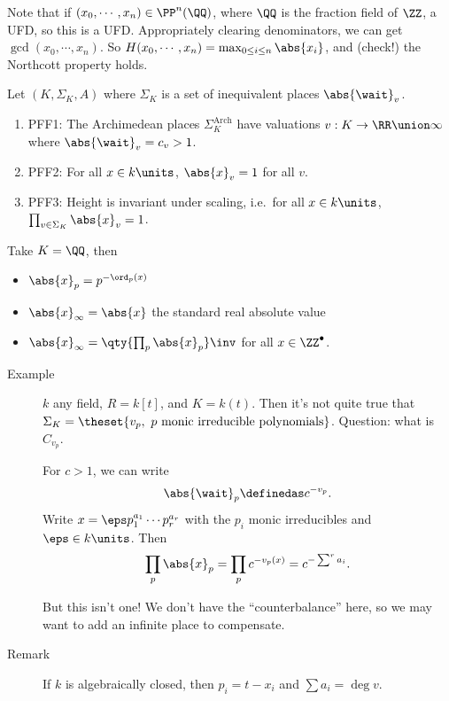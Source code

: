 Note that if \((x_0, \cdots, x_n) \in \PP^n(\QQ)\), where \(\QQ\) is the
fraction field of \(\ZZ\), a UFD, so this is a UFD. Appropriately
clearing denominators, we can get \(\gcd(x_0, \cdots, x_n)\). So
\(H(x_0, \cdots, x_n) = \max_{0\leq i \leq n} \abs{x_i}\), and (check!)
the Northcott property holds.

Let \((K, \Sigma_K, A)\) where \(\Sigma_K\) is a set of inequivalent
places \(\abs{\wait}_v\).

\begin{enumerate}
\def\labelenumi{\arabic{enumi}.}
\item
  PFF1: The Archimedean places \(\Sigma_K^{\text{Arch}}\) have
  valuations \(v: K \to \RR \union \infty\) where
  \(\abs{\wait}_v = c_v > 1\).
\item
  PFF2: For all \(x\in k\units\), \(\abs{x}_v = 1\) for all \(v\).
\item
  PFF3: Height is invariant under scaling, i.e.~for all
  \(x\in k\units\), \(\prod_{v\in\Sigma_K} \abs{x}_v = 1\).
\end{enumerate}

\begin{description}
\tightlist
\item[Example]
Take \(K = \QQ\), then
\end{description}

\begin{itemize}
\tightlist
\item
  \(\abs{x}_p = p^{-\ord_p(x)}\)
\item
  \(\abs{x}_\infty = \abs{x}\) the standard real absolute value
\item
  \(\abs{x}_\infty = \qty{\prod_p \abs{x}_p }\inv\) for all
  \(x\in \ZZ^\bullet\).
\end{itemize}

\begin{description}
\item[Example]
\(k\) any field, \(R = k[t]\), and \(K = k(t)\). Then it's not quite
true that
\(\Sigma_K = \theset{v_p, ~p \text{ monic irreducible polynomials}}\).
Question: what is \(C_{v_p}\).

For \(c>1\), we can write
\begin{align*}
\abs{\wait}_p \definedas c^{-v_p}
.\end{align*} Write \(x = \eps p_1^{a_1} \cdots p_{r}^{a_r}\) with the
\(p_i\) monic irreducibles and \(\eps \in k\units\). Then
\begin{align*}
\prod_p \abs{x}_p = \prod_p c^{-v_p(x)} = c^{-\sum^r a_i}
.\end{align*}

But this isn't one! We don't have the ``counterbalance'' here, so we may
want to add an infinite place to compensate.
\item[Remark]
If \(k\) is algebraically closed, then \(p_i = t - x_i\) and
\(\sum a_i = \deg v\).
\end{description}

